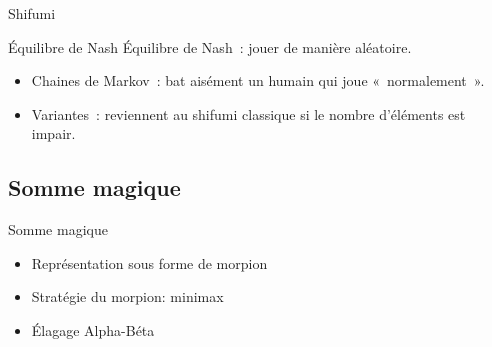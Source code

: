 \documentclass{beamer}
\begin{document}
\begin{frame}{Shifumi}
    \begin{block}{Équilibre de Nash}
        Équilibre de Nash~: jouer de manière aléatoire.
    \end{block}

    \begin{itemize}
        \item Chaines de Markov~: bat aisément un humain qui joue «~normalement~».
        \item Variantes~: reviennent au shifumi classique si le nombre d'éléments est impair.
    \end{itemize}
\end{frame}

\subsection{Somme magique}
\begin{frame}{Somme magique}
  \begin{itemize}
  \item Représentation sous forme de morpion
  \item Stratégie du morpion: minimax
  \item Élagage Alpha-Béta
  \end{itemize}
\end{frame}
\end{document}
